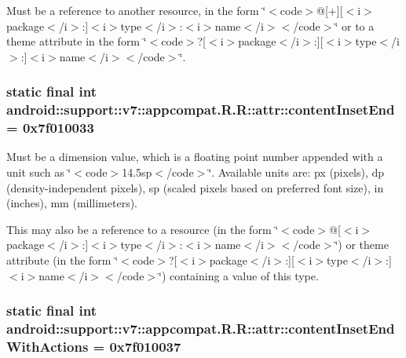 Must be a reference to another resource, in the form \char`\"{}$<$code$>$@\mbox{[}+\mbox{]}\mbox{[}$<$i$>$package$<$/i$>$:\mbox{]}$<$i$>$type$<$/i$>$:$<$i$>$name$<$/i$>$$<$/code$>$\char`\"{} or to a theme attribute in the form \char`\"{}$<$code$>$?\mbox{[}$<$i$>$package$<$/i$>$:\mbox{]}\mbox{[}$<$i$>$type$<$/i$>$:\mbox{]}$<$i$>$name$<$/i$>$$<$/code$>$\char`\"{}. \hypertarget{classandroid_1_1support_1_1v7_1_1appcompat_1_1_r_1_1attr_f84368a64f2f72fdddac19c472509446}{
\subsubsection[{contentInsetEnd}]{\setlength{\rightskip}{0pt plus 5cm}static final int android::support::v7::appcompat.R.R::attr::contentInsetEnd = 0x7f010033}}
\label{classandroid_1_1support_1_1v7_1_1appcompat_1_1_r_1_1attr_f84368a64f2f72fdddac19c472509446}


Must be a dimension value, which is a floating point number appended with a unit such as \char`\"{}$<$code$>$14.5sp$<$/code$>$\char`\"{}. Available units are: px (pixels), dp (density-independent pixels), sp (scaled pixels based on preferred font size), in (inches), mm (millimeters). 

This may also be a reference to a resource (in the form \char`\"{}$<$code$>$@\mbox{[}$<$i$>$package$<$/i$>$:\mbox{]}$<$i$>$type$<$/i$>$:$<$i$>$name$<$/i$>$$<$/code$>$\char`\"{}) or theme attribute (in the form \char`\"{}$<$code$>$?\mbox{[}$<$i$>$package$<$/i$>$:\mbox{]}\mbox{[}$<$i$>$type$<$/i$>$:\mbox{]}$<$i$>$name$<$/i$>$$<$/code$>$\char`\"{}) containing a value of this type. \hypertarget{classandroid_1_1support_1_1v7_1_1appcompat_1_1_r_1_1attr_7b7dd8edc3e48921cf2e6c01468c8459}{
\subsubsection[{contentInsetEndWithActions}]{\setlength{\rightskip}{0pt plus 5cm}static final int android::support::v7::appcompat.R.R::attr::contentInsetEndWithActions = 0x7f010037}}
\label{classandroid_1_1support_1_1v7_1_1appcompat_1_1_r_1_1attr_7b7dd8edc3e48921cf2e6c01468c8459}


